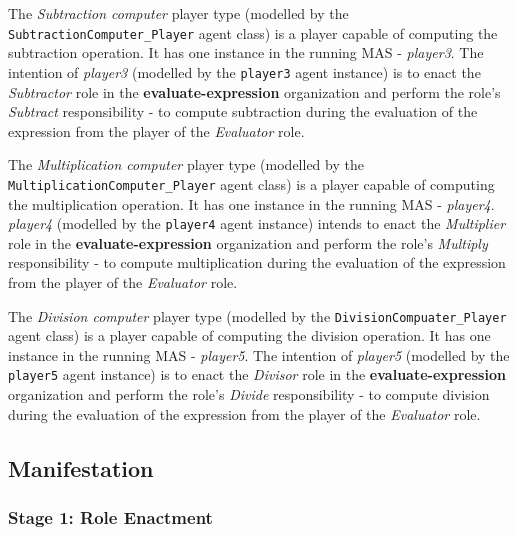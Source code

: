The \textit{Subtraction computer} player type (modelled by the \texttt{SubtractionComputer\_Player} agent class) is a player capable of computing the subtraction operation.
It has one instance in the running MAS - \textit{player3}.
The intention of \textit{player3} (modelled by the \texttt{player3} agent instance) is to enact the \textit{Subtractor} role in the \textbf{evaluate-expression} organization and perform the role's \textit{Subtract} responsibility - to compute subtraction during the evaluation of the expression from the player of the  \textit{Evaluator} role.

The \textit{Multiplication computer} player type (modelled by the \texttt{MultiplicationComputer\_Player} agent class) is a player capable of computing the multiplication operation.
It has one instance in the running MAS - \textit{player4}.
\textit{player4} (modelled by the \texttt{player4} agent instance) intends to enact the \textit{Multiplier} role in the \textbf{evaluate-expression} organization and perform the role's \textit{Multiply} responsibility - to compute multiplication during the evaluation of the expression from the player of the \textit{Evaluator} role.

The \textit{Division computer} player type (modelled by the \texttt{DivisionCompuater\_Player} agent class) is a player capable of computing the division operation.
It has one instance in the running MAS - \textit{player5}.
The intention of \textit{player5} (modelled by the \texttt{player5} agent instance) is to enact the \textit{Divisor} role in the \textbf{evaluate-expression} organization and perform the role's \textit{Divide} responsibility - to compute division during the evaluation of the expression from the player of the \textit{Evaluator} role.

\subsection*{Manifestation}

\subsubsection*{Stage 1: Role Enactment}

